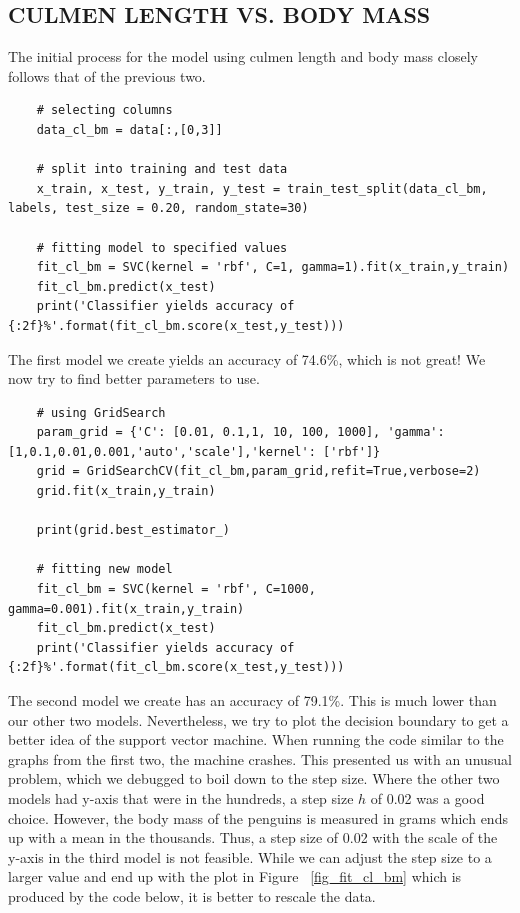 \documentclass[12pt]{article}
\begin{document}
\subsection{CULMEN LENGTH VS. BODY MASS}

The initial process for the model using culmen length and body mass closely follows that of the previous two.

\begin{verbatim}
    # selecting columns
    data_cl_bm = data[:,[0,3]]

    # split into training and test data
    x_train, x_test, y_train, y_test = train_test_split(data_cl_bm, labels, test_size = 0.20, random_state=30)

    # fitting model to specified values
    fit_cl_bm = SVC(kernel = 'rbf', C=1, gamma=1).fit(x_train,y_train)
    fit_cl_bm.predict(x_test)
    print('Classifier yields accuracy of {:2f}%'.format(fit_cl_bm.score(x_test,y_test)))
\end{verbatim}

The first model we create yields an accuracy of 74.6\%, which is not great! We now try to find better parameters to use.

\begin{verbatim}
    # using GridSearch
    param_grid = {'C': [0.01, 0.1,1, 10, 100, 1000], 'gamma': [1,0.1,0.01,0.001,'auto','scale'],'kernel': ['rbf']}
    grid = GridSearchCV(fit_cl_bm,param_grid,refit=True,verbose=2)
    grid.fit(x_train,y_train)

    print(grid.best_estimator_)

    # fitting new model
    fit_cl_bm = SVC(kernel = 'rbf', C=1000, gamma=0.001).fit(x_train,y_train)
    fit_cl_bm.predict(x_test)
    print('Classifier yields accuracy of {:2f}%'.format(fit_cl_bm.score(x_test,y_test)))
\end{verbatim}

The second model we create has an accuracy of 79.1\%. This is much lower than our other two models. Nevertheless, we try to plot the decision boundary to get a better idea of the support vector machine. When running the code similar to the graphs from the first two, the machine crashes. This presented us with an unusual problem, which we debugged to boil down to the step size. Where the other two models had y-axis that were in the hundreds, a step size $h$ of 0.02 was a good choice. However, the body mass of the penguins is measured in grams which ends up with a mean in the thousands. Thus, a step size of 0.02 with the scale of the y-axis in the third model is not feasible. While we can adjust the step size to a larger value and end up with the plot in Figure ~\ref{fig_fit_cl_bm} which is produced by the code below, it is better to rescale the data.
\end{document}
